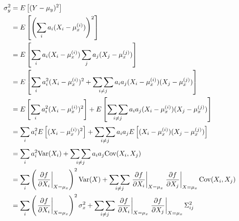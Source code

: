 \documentclass[a4paper, 10pt]{article}
\begin{document}
\begin{equation}
    \begin{split}
        \sigma_y^{2} &= E\left[(Y-\mu_y)^{2}\right] \\
        &=E\left[\left(\sum_{i}^{}{a_i(X_i-\mu_x^{(i)})}\right)^{2}\right] \\
        &=E\left[\sum_{i}^{}{a_i(X_i-\mu_x^{(i)})} \sum_{j}^{}{a_j(X_j-\mu_x^{(j)})}\right] \\
        &=E\left[\sum_{i}^{}{a_i^{2}(X_i-\mu_x^{(i)})^{2}}+\mathop{\sum\sum}_{i\neq j}{a_i a_j (X_i-\mu_x^{(i)})(X_j-\mu_x^{(j)})}\right] \\
        &=E\left[\sum_{i}^{}{a_i^{2}(X_i-\mu_x^{(i)})^{2}}\right]+E\left[\mathop{\sum\sum}_{i\neq j}{a_i a_j (X_i-\mu_x^{(i)})(X_j-\mu_x^{(j)})}\right] \\
        &=\sum_{i}^{}a_i^{2}E\left[{(X_i-\mu_x^{(i)})^{2}}\right]+\mathop{\sum\sum}_{i\neq j}a_i a_jE\left[{ (X_i-\mu_x^{(i)})(X_j-\mu_x^{(j)})}\right] \\
        &=\sum_{i}^{}a_i^{2}\textnormal{Var}(X_i)+\mathop{\sum\sum}_{i\neq j} a_i a_j\textnormal{Cov}(X_i, X_j) \\
        &=\sum_{i}^{}\left(\left.\dfrac{\partial f}{\partial X_i}\right\rvert_{X=\mu_x}\right)^{2}\textnormal{Var}(X)+\mathop{\sum\sum}_{i\neq j} \left.\dfrac{\partial f}{\partial X_i}\right\rvert_{X=\mu_x} \left.\dfrac{\partial f}{\partial X_j}\right\rvert_{X=\mu_x}\textnormal{Cov}(X_i, X_j) \\
        &=\sum_{i}^{}\left(\left.\dfrac{\partial f}{\partial X_i}\right\rvert_{X=\mu_x}\right)^{2}\sigma^{2}_x+\mathop{\sum\sum}_{i\neq j} \left.\dfrac{\partial f}{\partial X_i}\right\rvert_{X=\mu_x} \left.\dfrac{\partial f}{\partial X_j}\right\rvert_{X=\mu_x}\Sigma^{2}_{ij} \\
    \end{split}
\end{equation}
\end{document}
